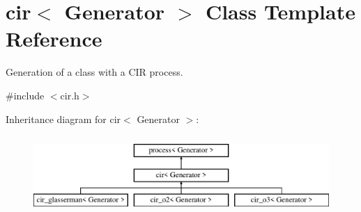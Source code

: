 \hypertarget{classcir}{}\section{cir$<$ Generator $>$ Class Template Reference}
\label{classcir}


Generation of a class with a C\+IR process.  




{\ttfamily \#include $<$cir.\+h$>$}

Inheritance diagram for cir$<$ Generator $>$\+:\begin{figure}[H]
\begin{center}
\leavevmode
\includegraphics[height=2.994653cm]{classcir}
\end{center}
\end{figure}
